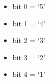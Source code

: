 \begin{itemize}
\item[] bit 0 = ‘5’
\item[] bit 1 = ‘4’
\item[] bit 2 = ‘3’
\item[] bit 3 = ‘2’
\item[] bit 4 = ‘1’
\end{itemize}

